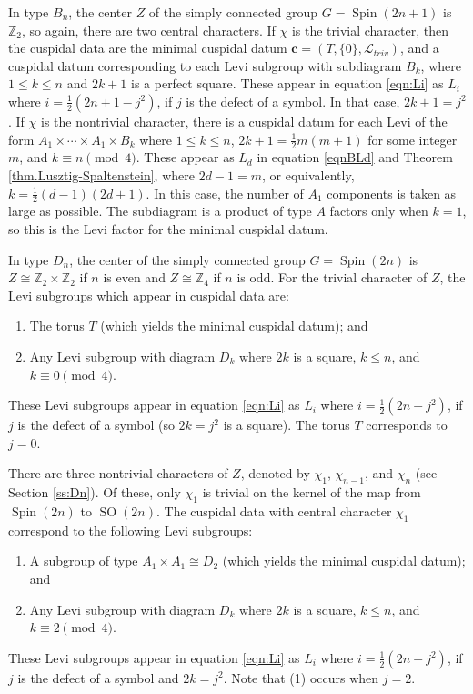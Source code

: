 \documentclass[reqno,11pt]{amsart}
\theoremstyle{remark}
\theoremstyle{remark}
\theoremstyle{definition}
\theoremstyle{definition}
\theoremstyle{definition}
\numberwithin{equation}{section}
\newcommand{\Z}{\mathbb{ Z}}           %
\newcommand{\SO}{\operatorname{SO}}
\newcommand{\Spin}{\operatorname{Spin}}
\newcommand{\cl}{\mathcal{L}}
\newcommand{\vc}{\mathbf{c}}
\begin{document}
In type $B_n$, the center $Z$ of the simply connected group $G = \Spin(2n+1)$ is $\Z_2$, so again, there are two central characters.  If $\chi$ is the trivial character, then the cuspidal data are the minimal cuspidal datum $\vc = (T, \{ 0 \}, \cl_{triv})$, and a cuspidal datum corresponding to each Levi subgroup with subdiagram $B_k$, where $1 \leq k \leq n$ and $2k+1$ is a perfect square. These appear in equation \eqref{eqn:Li} as $L_i$ where $i = \frac{1}{2}(2n+1-j^2)$, if $j$ is the defect of a symbol.  In that case, $2k+1 = j^2$.  If $\chi$ is the nontrivial character, there is a cuspidal datum for each Levi of the form $A_1\times \cdots\times A_1\times B_k$ where $1 \leq k\leq n$, $2k+1 = \frac{1}{2}m(m+1)$ for some integer $m$, and $k\equiv n \pmod{4}$.  These appear as $L_d$ in equation \eqref{eqnBLd} and
Theorem \ref{thm.Lusztig-Spaltenstein}, where $2d-1 = m$, or equivalently, $k = \frac{1}{2}(d-1)(2d+1)$.   In this case, the number of $A_1$ components is taken as large as possible.  
The subdiagram is a product of type $A$ factors only when $k = 1$, so this is the Levi factor for the minimal cuspidal datum.


In type $D_n$, the center of the simply connected group $G = \Spin(2n)$ is $Z \cong \mathbb Z_2\times \mathbb Z_2$ if $n$ is even and $Z \cong \mathbb Z_4$ if $n$ is odd. 
For the trivial character of $Z$, the Levi subgroups which appear in cuspidal data are:
\begin{enumerate}
\item The torus $T$ (which yields the minimal cuspidal datum); and
\item Any Levi subgroup with diagram $D_k$ where $2k$ is a square, $k\leq n$, and $k\equiv 0\pmod 4$.  
\end{enumerate}
These Levi subgroups appear in equation \eqref{eqn:Li} as $L_i$ where $i = \frac{1}{2}(2n-j^2)$, if $j$ is the defect of a symbol (so $2k=j^2$ is a square).  The torus $T$ corresponds to $j=0$.

There are three nontrivial characters of $Z$, denoted by $\chi_1$, $\chi_{n-1}$, and $\chi_n$ (see Section \ref{ss:Dn}). Of these, only $\chi_1$ is trivial on the kernel of the map from $\Spin(2n)$ to $\SO(2n)$.
The cuspidal data with central character $\chi_1$ correspond to the following Levi subgroups: 
\begin{enumerate}
\item A subgroup of type $A_1\times A_1 \cong D_2$ (which yields the minimal cuspidal datum); and
\item Any Levi subgroup with diagram $D_k$ where $2k$ is a square, $k\leq n$, and $k\equiv 2\pmod 4$.  
\end{enumerate}
These Levi subgroups appear in equation \eqref{eqn:Li} as $L_i$ where $i = \frac{1}{2}(2n-j^2)$, if $j$ is the defect of a symbol and $2k=j^2$.  Note that (1) occurs when $j = 2$.
\end{document}
